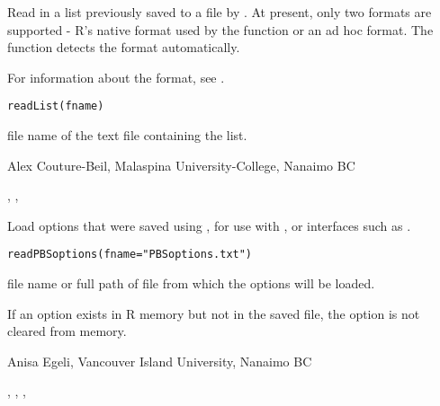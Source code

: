 \documentclass[letterpaper]{book}
\begin{document}
\begin{Description}\relax
Read in a list previously saved to a file by . 
At present, only two formats are supported - R's native format 
used by the  function or an ad hoc  format. 
The function  detects the format automatically.

For information about the  format, see .
\end{Description}
\begin{Usage}
\begin{verbatim}
readList(fname)
\end{verbatim}
\end{Usage}
\begin{Arguments}
\begin{ldescription}
\item[\code{fname}] file name of the text file containing the list.
\end{ldescription}
\end{Arguments}
\begin{Author}\relax
Alex Couture-Beil, Malaspina University-College, Nanaimo BC
\end{Author}
\begin{SeeAlso}\relax
{}, , 
\end{SeeAlso}

\begin{Description}\relax
Load options that were saved using , for use
with ,  or interfaces such as
.
\end{Description}
\begin{Usage}
\begin{verbatim}
readPBSoptions(fname="PBSoptions.txt")
\end{verbatim}
\end{Usage}
\begin{Arguments}
\begin{ldescription}
\item[\code{fname}] file name or full path of file from which the options will be loaded.
\end{ldescription}
\end{Arguments}
\begin{Note}\relax
If an option exists in R memory but not in the saved file, 
the option is not cleared from memory.
\end{Note}
\begin{Author}\relax
Anisa Egeli, Vancouver Island University, Nanaimo BC
\end{Author}
\begin{SeeAlso}\relax
{}, ,
, 
\end{SeeAlso}
\end{document}
